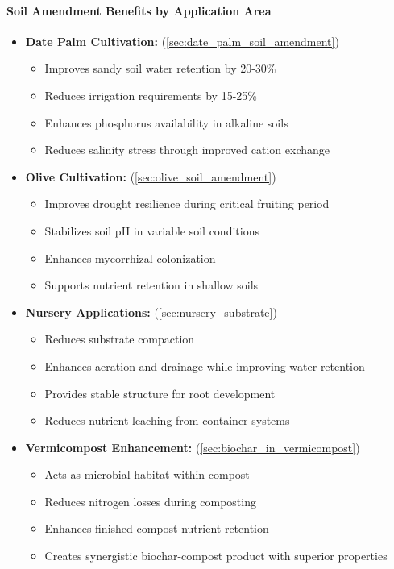 \paragraph{Soil Amendment Benefits by Application Area}
\begin{itemize}
    \item \textbf{Date Palm Cultivation:} (\ref{sec:date_palm_soil_amendment})
    \begin{itemize}
        \item Improves sandy soil water retention by 20-30\%
        \item Reduces irrigation requirements by 15-25\%
        \item Enhances phosphorus availability in alkaline soils
        \item Reduces salinity stress through improved cation exchange
    \end{itemize}
    
    \item \textbf{Olive Cultivation:} (\ref{sec:olive_soil_amendment})
    \begin{itemize}
        \item Improves drought resilience during critical fruiting period
        \item Stabilizes soil pH in variable soil conditions
        \item Enhances mycorrhizal colonization
        \item Supports nutrient retention in shallow soils
    \end{itemize}
    
    \item \textbf{Nursery Applications:} (\ref{sec:nursery_substrate})
    \begin{itemize}
        \item Reduces substrate compaction
        \item Enhances aeration and drainage while improving water retention
        \item Provides stable structure for root development
        \item Reduces nutrient leaching from container systems
    \end{itemize}
    
    \item \textbf{Vermicompost Enhancement:} (\ref{sec:biochar_in_vermicompost})
    \begin{itemize}
        \item Acts as microbial habitat within compost
        \item Reduces nitrogen losses during composting
        \item Enhances finished compost nutrient retention
        \item Creates synergistic biochar-compost product with superior properties
    \end{itemize}
\end{itemize}

